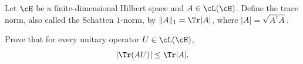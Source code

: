 Let $\cH$ be a finite-dimensional Hilbert space and $A\in \cL(\cH)$. Define the trace norm, also called the Schatten $1$-norm, by $\|A\|_1=\Tr|A|$, where $|A|=\sqrt{A^\dagger A}$.

Prove that for every unitary operator $U\in \cL(\cH)$,
$$
\left|\Tr(AU)\right|
\leq
\Tr|A|.
$$
